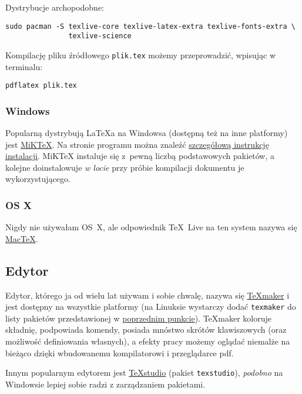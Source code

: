 \documentclass[11pt,a4paper]{article}
\begin{document}
Dystrybucje archopodobne:

\begin{verbatim}
sudo pacman -S texlive-core texlive-latex-extra texlive-fonts-extra \
               texlive-science
\end{verbatim}

Kompilację pliku źródłowego \verb+plik.tex+ możemy przeprowadzić, wpisując w terminalu:
\begin{verbatim}
pdflatex plik.tex
\end{verbatim}

\subsubsection{Windows}

Popularną dystrybują \LaTeX a na Windowsa (dostępną też na inne platformy) jest \href{https://miktex.org/}{MiK\TeX}. Na stronie programu można znaleźć \href{https://miktex.org/howto/install-miktex}{szczegółową instrukcję instalacji}. MiK\TeX{} instaluje się z~pewną liczbą podstawowych pakietów, a kolejne doinstalowuje \textit{w locie} przy próbie kompilacji dokumentu je wykorzystującego.

\subsubsection{OS X}

Nigdy nie używałam OS~X, ale odpowiednik \TeX~Live na ten system nazywa się \href{http://tug.org/mactex/}{Mac\TeX}.

\subsection{Edytor}

Edytor, którego ja od wielu lat używam i sobie chwalę, nazywa się \href{http://www.xm1math.net/texmaker/}{\TeX maker} i jest dostępny na wszystkie platformy (na Linuksie wystarczy dodać \texttt{texmaker} do listy pakietów przedstawionej w \hyperref[sec:kompilator-linux]{poprzednim punkcie}). \TeX maker koloruje składnię, podpowiada komendy, posiada mnóstwo skrótów klawiszowych (oraz możliwość definiowania własnych), a efekty pracy możemy oglądać niemalże na bieżąco dzięki wbudowanemu kompilatorowi i przeglądarce pdf.

Innym popularnym edytorem jest \href{http://texstudio.org/}{\TeX studio} (pakiet \texttt{texstudio}), \emph{podobno} na Windowsie  lepiej sobie radzi z zarządzaniem pakietami.
\end{document}
